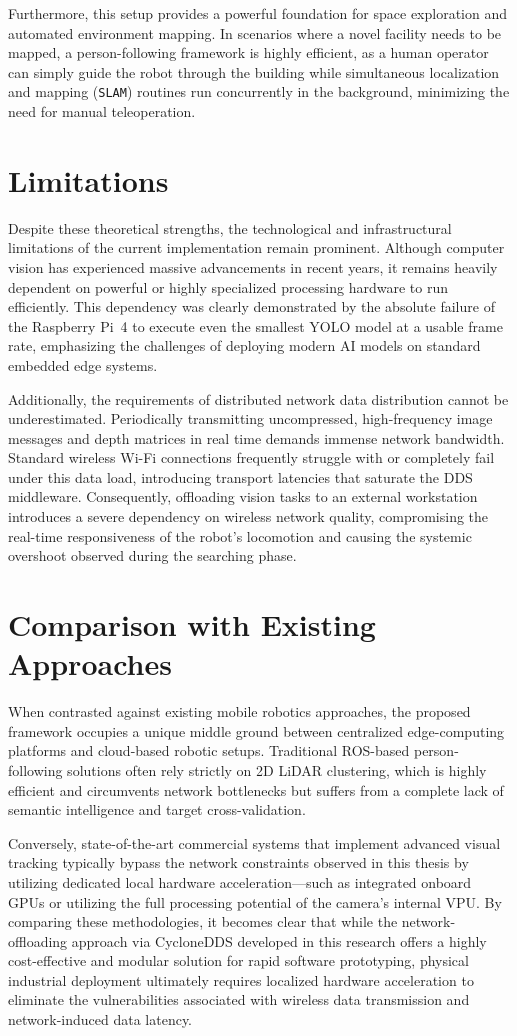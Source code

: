 Furthermore, this setup provides a powerful foundation for space exploration and automated environment mapping. In scenarios where a novel facility needs to be mapped, a person-following framework is highly efficient, as a human operator can simply guide the robot through the building while simultaneous localization and mapping (\texttt{SLAM}) routines run concurrently in the background, minimizing the need for manual teleoperation.

\section{Limitations}
Despite these theoretical strengths, the technological and infrastructural limitations of the current implementation remain prominent. Although computer vision has experienced massive advancements in recent years, it remains heavily dependent on powerful or highly specialized processing hardware to run efficiently. This dependency was clearly demonstrated by the absolute failure of the Raspberry Pi~4 to execute even the smallest YOLO model at a usable frame rate, emphasizing the challenges of deploying modern AI models on standard embedded edge systems.

Additionally, the requirements of distributed network data distribution cannot be underestimated. Periodically transmitting uncompressed, high-frequency image messages and depth matrices in real time demands immense network bandwidth. Standard wireless Wi-Fi connections frequently struggle with or completely fail under this data load, introducing transport latencies that saturate the DDS middleware. Consequently, offloading vision tasks to an external workstation introduces a severe dependency on wireless network quality, compromising the real-time responsiveness of the robot's locomotion and causing the systemic overshoot observed during the searching phase.

\section{Comparison with Existing Approaches}
When contrasted against existing mobile robotics approaches, the proposed framework occupies a unique middle ground between centralized edge-computing platforms and cloud-based robotic setups. Traditional ROS-based person-following solutions often rely strictly on 2D LiDAR clustering, which is highly efficient and circumvents network bottlenecks but suffers from a complete lack of semantic intelligence and target cross-validation. 

Conversely, state-of-the-art commercial systems that implement advanced visual tracking typically bypass the network constraints observed in this thesis by utilizing dedicated local hardware acceleration—such as integrated onboard GPUs or utilizing the full processing potential of the camera’s internal VPU. By comparing these methodologies, it becomes clear that while the network-offloading approach via CycloneDDS developed in this research offers a highly cost-effective and modular solution for rapid software prototyping, physical industrial deployment ultimately requires localized hardware acceleration to eliminate the vulnerabilities associated with wireless data transmission and network-induced data latency.
